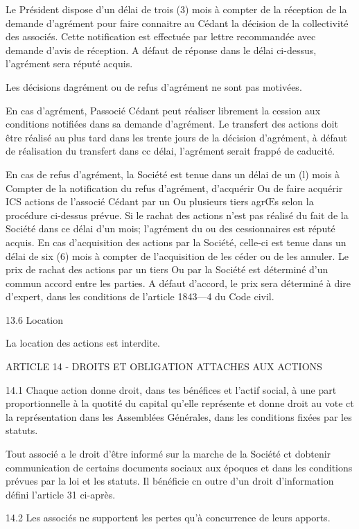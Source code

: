 \documentclass{article}
\begin{document}
Le Président dispose d'un délai de trois (3) mois à compter de la réception de la demande d'agrément pour faire connaitre au Cédant la décision de la collectivité des associés. Cette notification est effectuée par lettre recommandée avec demande d'avis de réception. A défaut de réponse dans le délai ci-dessus, l'agrément sera réputé acquis.

Les décisions dagrément ou de refus d'agrément ne sont pas motivées.

En cas d'agrément, Passocié Cédant peut réaliser librement la cession aux conditions notifiées dans sa demande d'agrément. Le transfert des actions doit être réalisé au plus tard dans les trente jours de la décision d'agrément, à défaut de réalisation du transfert dans cc délai, l'agrément serait frappé de caducité.

En cas de refus d'agrément, la Société est tenue dans un délai de un (l) mois à Compter de la notification du refus d'agrément, d'acquérir Ou de faire acquérir ICS actions de l'associé Cédant par un Ou plusieurs tiers agrŒs selon la procédure ci-dessus prévue.
Si le rachat des actions n'est pas réalisé du fait de la Société dans ce délai d'un mois; l'agrément du ou des cessionnaires est réputé acquis.
En cas d'acquisition des actions par la Société, celle-ci est tenue dans un délai de six (6) mois à compter de l'acquisition de les céder ou de les annuler.
Le prix de rachat des actions par un tiers Ou par la Société est déterminé d'un commun accord entre les parties. A défaut d'accord, le prix sera déterminé à dire d'expert, dans les conditions de l'article 1843—4 du Code civil.

13.6 Location

La location des actions est interdite.

ARTICLE 14 - DROITS ET OBLIGATION ATTACHES AUX ACTIONS

14.1 Chaque action donne droit, dans tes bénéfices et l'actif social, à une part proportionnelle à la quotité du capital qu'elle représente et donne droit au vote ct la représentation dans les Assemblées Générales, dans les conditions fixées par les statuts.

Tout associé a le droit d'être informé sur la marche de la Société ct dobtenir communication de certains documents sociaux aux époques et dans les conditions prévues par la loi et les statuts. Il bénéficie cn outre d'un droit d'information défini l'article 31 ci-après.

14.2 Les associés ne supportent les pertes qu'à concurrence de leurs apports.
\end{document}

